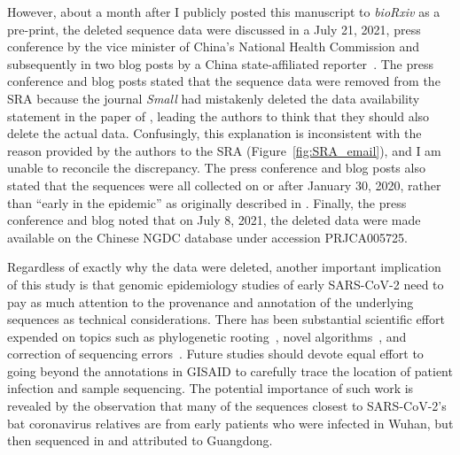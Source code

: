 \documentclass[9pt,twocolumn,twoside]{gsajnl_modified}
\begin{document}
However, about a month after I publicly posted this manuscript to \textit{bioRxiv} as a pre-print, the deleted sequence data were discussed in a July 21, 2021, press conference by the vice minister of China's National Health Commission and subsequently in two blog posts by a China state-affiliated reporter~\citep{wang2021exclusive,wang2021why}.
The press conference and blog posts stated that the sequence data were removed from the SRA because the journal \textit{Small} had mistakenly deleted the data availability statement in the paper of \citet{wang2020small}, leading the authors to think that they should also delete the actual data.
Confusingly, this explanation is inconsistent with the reason provided by the authors to the SRA (Figure~\ref{fig:SRA_email}), and I am unable to reconcile the discrepancy.
The press conference and blog posts also stated that the sequences were all collected on or after January 30, 2020, rather than ``early in the epidemic'' as originally described in \citet{wang2020medRxiv,wang2020small}.
Finally, the press conference and blog noted that on July 8, 2021, the deleted data were made available on the Chinese NGDC database under accession PRJCA005725.

Regardless of exactly why the data were deleted, another important implication of this study is that genomic epidemiology studies of early SARS-CoV-2 need to pay as much attention to the provenance and annotation of the underlying sequences as technical considerations.
There has been substantial scientific effort expended on topics such as phylogenetic rooting~\citep{pipes2021assessing, morel2021phylogenetic}, novel algorithms~\citep{kumar2021evolutionary}, and correction of sequencing errors~\citep{turakhia2020stability}.
Future studies should devote equal effort to going beyond the annotations in GISAID to carefully trace the location of patient infection and sample sequencing.
The potential importance of such work is revealed by the observation that many of the sequences closest to SARS-CoV-2's bat coronavirus relatives are from early patients who were infected in Wuhan, but then sequenced in and attributed to Guangdong.
\end{document}
